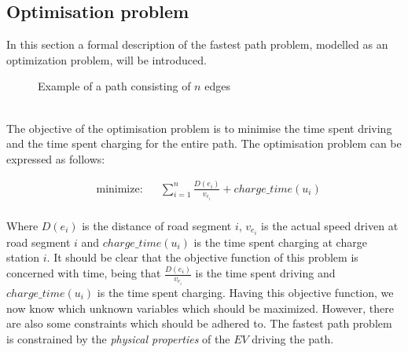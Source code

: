 \subsection{Optimisation problem}
In this section a formal description of the fastest path problem, modelled as an optimization problem, will be introduced.

\begin{figure}[h!]
\centering
    \caption{Example of a path consisting of $n$ edges} \label{fig:pathexample}
\end{figure} \\


The objective of the optimisation problem is to minimise the time spent driving 
and the time spent charging for the entire path. The optimisation problem can be expressed as follows:

\begin{equation}
	\begin{aligned} & 
	{\text{minimize:}}
	& & \sum_{i=1}^{n} \frac{D(e_i)}{v_{e_i}} + charge\_time(u_i) \\
	\end{aligned}
\end{equation}\label{eq:objfunction}

Where $D(e_i)$ is the distance of road segment $i$, $v_{e_i}$ is the actual speed driven at road segment $i$ and $charge\_time(u_i)$ is the time spent charging at charge station $i$. It should be clear that the objective function of this problem is concerned with time, being that $\frac{D(e_i)}{v_{e_i}}$ is the time spent driving and $charge\_time(u_i)$ is the time spent charging. Having this objective function, we now know which unknown variables which should be maximized. However, there are also some constraints which should be adhered to. The fastest path problem is constrained by the \emph{physical properties} of the $EV$ driving the path.  

